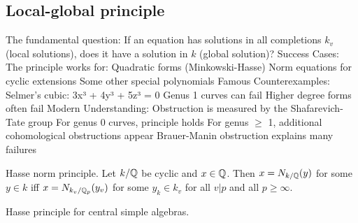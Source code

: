 \subsection{Local-global principle}

\begin{outline}
\0 The fundamental question: If an equation has solutions in all completions $k_v$ (local solutions), does it have a solution in $k$ (global solution)?
    \1 Success Cases: The principle works for:
        \2 Quadratic forms (Minkowski-Hasse)
        \2 Norm equations for cyclic extensions
        \2 Some other special polynomials
    \1 Famous Counterexamples:
        \2 Selmer's cubic: 3x³ + 4y³ + 5z³ = 0
        \2 Genus 1 curves can fail
        \2 Higher degree forms often fail
    \1 Modern Understanding:
        \2 Obstruction is measured by the Shafarevich-Tate group
        \2 For genus 0 curves, principle holds
        \2 For genus $\geq$ 1, additional cohomological obstructions appear
        \2 Brauer-Manin obstruction explains many failures
\0 \begin{theorem}
    Hasse norm principle. Let $k/\mathbb{Q}$ be cyclic and $x\in \mathbb{Q}$. Then $x=N_{k/\mathbb{Q}}(y)$ for some $y\in k$ iff $x=N_{k_v/\mathbb{Q}_p}(y_v)$ for some $y_k\in k_v$ for all $v|p$ and all $p\geq \infty$. 
\end{theorem}

\0 \begin{theorem}
    Hasse principle for central simple algebras. 
\end{theorem}
\end{outline}   



  